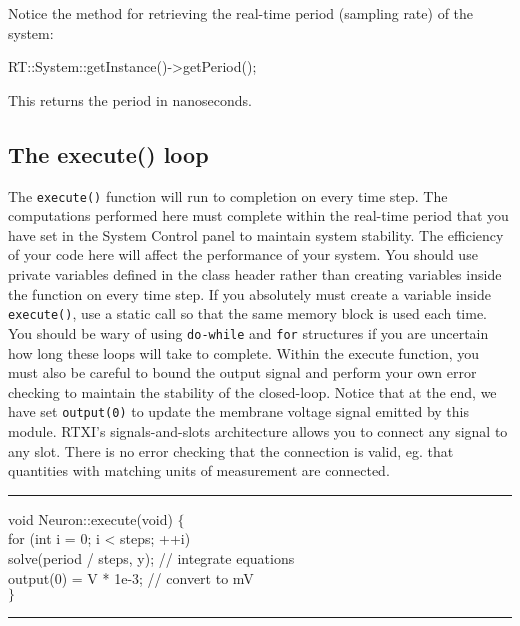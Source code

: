Notice the method for retrieving the real-time period (sampling rate) of the system:
\begin{example}
RT::System::getInstance()->getPeriod();
\end{example}

This returns the period in nanoseconds. 


\subsection{The execute() loop}
\label{DefaultGUIModel execute}
The \texttt{execute()} function will run to completion on every time step. The computations performed here must complete within the real-time period that you have set in the System Control panel to maintain system stability. The efficiency of your code here will affect the performance of your system. You should use private variables defined in the class header rather than creating variables inside the function on every time step. If you absolutely must create a variable inside \texttt{execute()}, use a static call so that the same memory block is used each time. \attention You should be wary of using \texttt{do-while} and \texttt{for} structures if you are uncertain how long these loops will take to complete. Within the execute function, you must also be careful to bound the output signal and perform your own error checking to maintain the stability of the closed-loop. Notice that at the end, we have set \texttt{output(0)} to update the membrane voltage signal emitted by this module. RTXI's signals-and-slots architecture allows you to \attention connect any signal to any slot. There is no error checking that the connection is valid, eg. that quantities with matching units of measurement are connected.

\bigskip\hrule
\begin{example}
void Neuron::execute(void) $\{$\\
\hspace{.5cm}for (int i = 0; i < steps; ++i)\\
\hspace{1cm}solve(period / steps, y); // integrate equations\\
\hspace{.5cm}output(0) = V * 1e-3; // convert to mV\\
$\}$\\
\end{example}
\bigskip
\hrule


